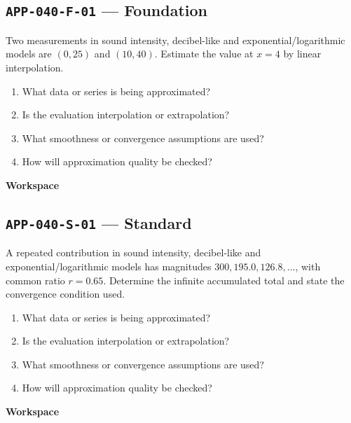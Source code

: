 \documentclass[11pt]{book}
\newcommand{\pid}[1]{\texttt{#1}}
\newcommand{\workspace}{\par\vspace{0.7in}\hrulefill\par\vspace{0.55in}\hrulefill\par}
\begin{document}
\subsection*{\pid{APP-040-F-01} — Foundation}
\begin{problembox}
Two measurements in sound intensity, decibel-like and exponential/logarithmic models are $(0,25)$ and $(10,40)$. Estimate the value at $x=4$ by linear interpolation.
\end{problembox}
\begin{promptbox}\begin{enumerate}
\item What data or series is being approximated?
\item Is the evaluation interpolation or extrapolation?
\item What smoothness or convergence assumptions are used?
\item How will approximation quality be checked?
\end{enumerate}\end{promptbox}
\textbf{Workspace}\workspace
{}
\subsection*{\pid{APP-040-S-01} — Standard}
\begin{problembox}
A repeated contribution in sound intensity, decibel-like and exponential/logarithmic models has magnitudes $300, 195.0, 126.8,\ldots$, with common ratio $r=0.65$. Determine the infinite accumulated total and state the convergence condition used.
\end{problembox}
\begin{promptbox}\begin{enumerate}
\item What data or series is being approximated?
\item Is the evaluation interpolation or extrapolation?
\item What smoothness or convergence assumptions are used?
\item How will approximation quality be checked?
\end{enumerate}\end{promptbox}
\textbf{Workspace}\workspace
{}
\end{document}
